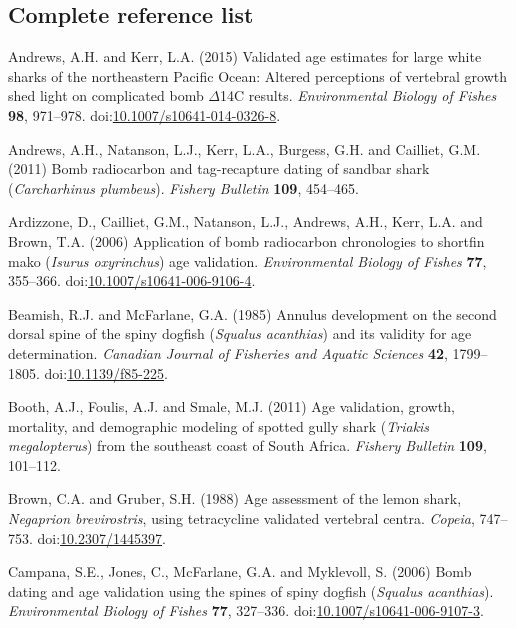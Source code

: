 \documentclass[]{article}
\title{}
\author{}
\date{}
\begin{document}
\subsection*{Complete reference list}\label{complete-reference-list}

\hypertarget{refs}{}
\hypertarget{ref-andrews_validated_2015}{}
Andrews, A.H. and Kerr, L.A. (2015) Validated age estimates for large
white sharks of the northeastern Pacific Ocean: Altered perceptions of
vertebral growth shed light on complicated bomb \(\Delta\)14C results.
\emph{Environmental Biology of Fishes} \textbf{98}, 971--978.
doi:\href{https://doi.org/10.1007/s10641-014-0326-8}{10.1007/s10641-014-0326-8}.

\hypertarget{ref-andrews_bomb_2011}{}
Andrews, A.H., Natanson, L.J., Kerr, L.A., Burgess, G.H. and Cailliet,
G.M. (2011) Bomb radiocarbon and tag-recapture dating of sandbar shark
(\emph{Carcharhinus plumbeus}). \emph{Fishery Bulletin} \textbf{109},
454--465.

\hypertarget{ref-ardizzone_application_2006}{}
Ardizzone, D., Cailliet, G.M., Natanson, L.J., Andrews, A.H., Kerr, L.A.
and Brown, T.A. (2006) Application of bomb radiocarbon chronologies to
shortfin mako (\emph{Isurus oxyrinchus}) age validation.
\emph{Environmental Biology of Fishes} \textbf{77}, 355--366.
doi:\href{https://doi.org/10.1007/s10641-006-9106-4}{10.1007/s10641-006-9106-4}.

\hypertarget{ref-beamish_annulus_1985}{}
Beamish, R.J. and McFarlane, G.A. (1985) Annulus development on the
second dorsal spine of the spiny dogfish (\emph{Squalus acanthias}) and
its validity for age determination. \emph{Canadian Journal of Fisheries
and Aquatic Sciences} \textbf{42}, 1799--1805.
doi:\href{https://doi.org/10.1139/f85-225}{10.1139/f85-225}.

\hypertarget{ref-booth_age_2011}{}
Booth, A.J., Foulis, A.J. and Smale, M.J. (2011) Age validation, growth,
mortality, and demographic modeling of spotted gully shark
(\emph{Triakis megalopterus}) from the southeast coast of South Africa.
\emph{Fishery Bulletin} \textbf{109}, 101--112.

\hypertarget{ref-brown_age_1988}{}
Brown, C.A. and Gruber, S.H. (1988) Age assessment of the lemon shark,
\emph{Negaprion brevirostris}, using tetracycline validated vertebral
centra. \emph{Copeia}, 747--753.
doi:\href{https://doi.org/10.2307/1445397}{10.2307/1445397}.

\hypertarget{ref-campana_bomb_2006}{}
Campana, S.E., Jones, C., McFarlane, G.A. and Myklevoll, S. (2006) Bomb
dating and age validation using the spines of spiny dogfish
(\emph{Squalus acanthias}). \emph{Environmental Biology of Fishes}
\textbf{77}, 327--336.
doi:\href{https://doi.org/10.1007/s10641-006-9107-3}{10.1007/s10641-006-9107-3}.
\end{document}
